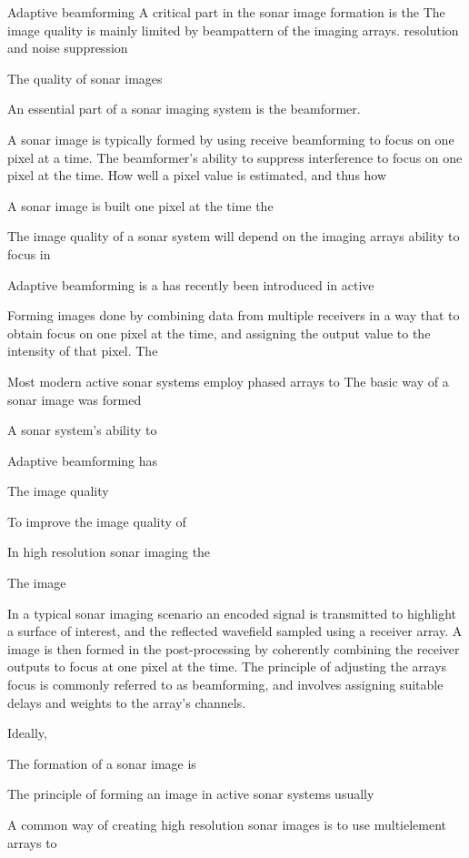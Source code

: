 \documentclass[12pt,journal,captionsoff,onecolumn]{IEEEtran}
\newcommand\1{\vec 1}
\begin{document}
Adaptive beamforming 
A critical part in the sonar image formation is the 
The image quality is mainly limited by beampattern of the imaging arrays.  resolution and noise suppression

The quality of sonar images 

An essential part of a sonar imaging system is the beamformer. 


A sonar image is typically formed by using receive beamforming to focus on one pixel at a time. The beamformer's ability to suppress interference   to focus on one pixel at the time. How well a pixel value is estimated, and thus how 

A sonar image is built one pixel at the time the 

The image quality of a sonar system will depend on the imaging arrays ability to focus in 

Adaptive beamforming is a has recently been introduced in active 

Forming images done by combining data from multiple receivers in a way that to obtain focus on one pixel at the time, and assigning the output value to the intensity of that pixel. The 

Most modern active sonar systems employ phased arrays to 
The basic way of a sonar image was formed 

A sonar system's ability to 

Adaptive beamforming has 

The image quality 

To improve the image quality of 

In high resolution sonar imaging the 

The image 


In a typical sonar imaging scenario an encoded signal is transmitted to highlight a surface of interest, and the reflected wavefield sampled using a receiver array. A image is then formed in the post-processing by coherently combining the receiver outputs to focus at one pixel at the time. The principle of adjusting the arrays focus is commonly referred to as beamforming, and involves assigning suitable delays and weights to the array's channels.

Ideally, 

The formation of a sonar image is 

The principle of forming an image in active sonar systems usually 

A common way of creating high resolution sonar images is to use multielement arrays to  
\end{document}
